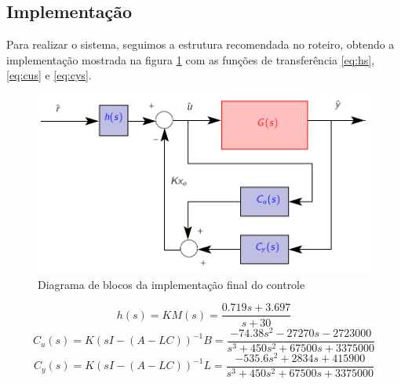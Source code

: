 \documentclass{article}
\begin{document}
\subsection{Implementação}
Para realizar o sistema, seguimos a estrutura recomendada no roteiro\cite{bb:roteiro}, obtendo a implementação mostrada na figura \ref{fig:impl} com as funções de transferência \ref{eq:hs}, \ref{eq:cus} e \ref{eq:cys}.
\begin{figure}[H]
	\centering
	\includegraphics[width=0.8\linewidth]{impl}
	\caption{Diagrama de blocos da implementação final do controle}
	\label{fig:impl}
\end{figure}

\begin{equation}
\label{eq:hs}
h(s) = KM(s) = \frac{0.719 s + 3.697}{s+30}
\end{equation}
\begin{equation}
\label{eq:cus}
C_u(s) = K(sI - (A - LC))^{-1}B = \frac{-74.38 s^2 - 27270 s - 2723000}{s^3 + 450 s^2 + 67500 s + 3375000}
\end{equation}
\begin{equation}
\label{eq:cys}
C_y(s) = K(sI - (A - LC))^{-1}L = \frac{-535.6 s^2 + 2834 s + 415900}{s^3 + 450 s^2 + 67500 s + 3375000}
\end{equation}
\end{document}
